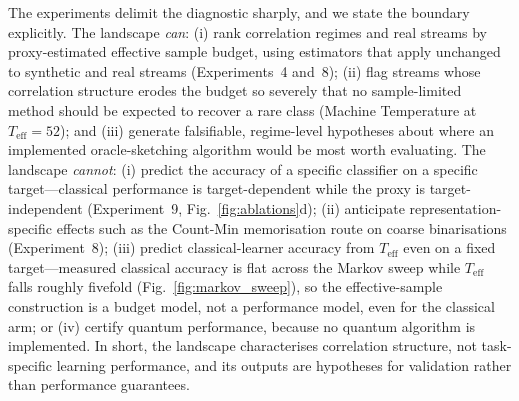 \documentclass[sensors,article,submit,pdftex,moreauthors]{Definitions/mdpi}
\newcommand{\Teff}{T_{\mathrm{eff}}}
\providecommand{\DIFadd}[1]{{\protect\color{blue}#1}} %
\providecommand{\DIFdel}[1]{} %
\providecommand{\DIFaddbegin}{} %
\providecommand{\DIFaddend}{} %
\providecommand{\DIFdelbegin}{} %
\providecommand{\DIFdelend}{} %
\begin{document}
\DIFadd{The experiments delimit the diagnostic sharply, and we state the boundary explicitly. The landscape }\emph{\DIFadd{can}}\DIFadd{: (i) rank correlation regimes and real streams by proxy-estimated effective sample budget, using estimators that apply unchanged to synthetic and real streams (Experiments~4 and~8); (ii) flag streams whose correlation structure erodes the budget so severely that no sample-limited method should be expected to recover a rare class (Machine Temperature at $\Teff = 52$); and (iii) generate falsifiable, regime-level hypotheses about where an implemented oracle-sketching algorithm would be most worth evaluating. The landscape }\emph{\DIFadd{cannot}}\DIFadd{: (i) predict the accuracy of a specific classifier on a specific target---classical performance is target-dependent while the proxy is target-independent (Experiment~9, Fig.~\ref{fig:ablations}d); (ii) anticipate representation-specific effects such as the Count-Min memorisation route on coarse binarisations (Experiment~8); (iii) predict classical-learner accuracy from $\Teff$ even on a fixed target---measured classical accuracy is flat across the Markov sweep while $\Teff$ falls roughly fivefold (Fig.~\ref{fig:markov_sweep}), so the }\DIFaddend effective-sample \DIFdelbegin \DIFdel{model}\DIFdelend \DIFaddbegin \DIFadd{construction is a budget model, not a performance model, even for the classical arm; or (iv) certify quantum performance, because no quantum algorithm is implemented. In short, the landscape characterises correlation structure, not task-specific learning performance, and its outputs are hypotheses for validation rather than performance guarantees.
}
\end{document}
